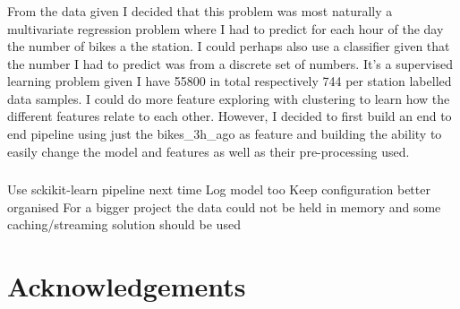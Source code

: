 \documentclass[a4paper]{article}
\begin{document}
    \subsubsection*{}
    From the data given I decided that this problem was most naturally a multivariate regression problem where I had to
    predict for each hour of the day the number of bikes a the station. I could perhaps also use a classifier given that
    the number I had to predict was from a discrete set of numbers. It's a supervised learning problem given I have 55800
    in total respectively 744 per station labelled data samples. I could do more feature exploring with clustering to
    learn how the different features relate to each other. However, I decided to first build an end to end pipeline using
    just the bikes\_3h\_ago as feature and building the ability to easily change the model and features as well as their
    pre-processing used.

    \subsubsection*{}
    Use sckikit-learn pipeline next time
    Log model too
    Keep configuration better organised
    For a bigger project the data could not be held in memory and some caching/streaming solution should be used


    \section*{Acknowledgements}

    
    
\end{document}
